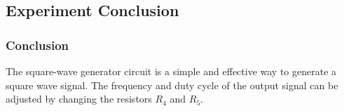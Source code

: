 \subsection{Experiment Conclusion}
    \subsubsection{Conclusion}
        The square-wave generator circuit is a simple and effective way to generate a square wave signal. The frequency and duty cycle of the output signal can be adjusted by changing the resistors $R_4$ and $R_5$.
        
